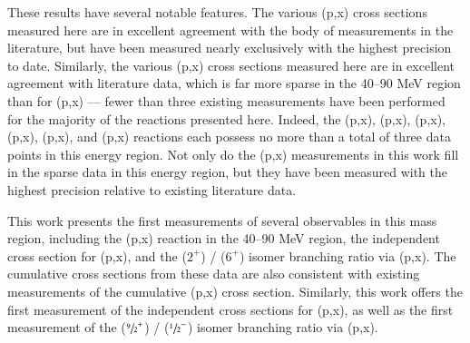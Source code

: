 These results have several notable features.
The various (p,x) cross sections measured here are in excellent agreement with the body of measurements in the literature,  but have been measured nearly exclusively with the highest precision to date.
Similarly, the various (p,x) cross sections measured here are in excellent agreement with literature data, which is far more sparse in the 40--90 MeV region than for (p,x) ---  fewer than three existing measurements have been performed for the majority of the reactions presented here.
Indeed,  the (p,x), (p,x), (p,x), (p,x), (p,x), and (p,x) reactions each possess no more than a total of three data points in this energy region.
Not only do the (p,x) measurements in this work fill in the sparse data in this energy region, but they have been measured with the highest precision relative to existing literature data.



This work presents the first measurements of several observables in 
this mass region, including the (p,x) reaction in the 40--90 MeV region, 
the independent cross section for       (p,x), and the  ($2^+$) /   ($6^+$)  isomer branching ratio via (p,x).  
The cumulative cross sections from these data are also consistent with existing measurements of the cumulative (p,x) cross section.
Similarly, this work offers the first measurement of the independent cross sections for (p,x),  as well as the first measurement of the      ($\sfrac{9}{2}^+$) /   ($\sfrac{1}{2}^-$) isomer branching ratio via (p,x).



